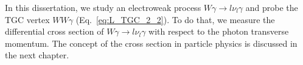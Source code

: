 In this dissertation, we study an electroweak process $W\gamma \rightarrow l \nu_l \gamma$ and probe the TGC vertex $WW\gamma$ (Eq.~\ref{eq:L_TGC_2_2}). To do that, we measure the differential cross section of $W\gamma \rightarrow l \nu_l \gamma$ with respect to the photon transverse momentum. The concept of the cross section in particle physics is discussed in the next chapter.\\

